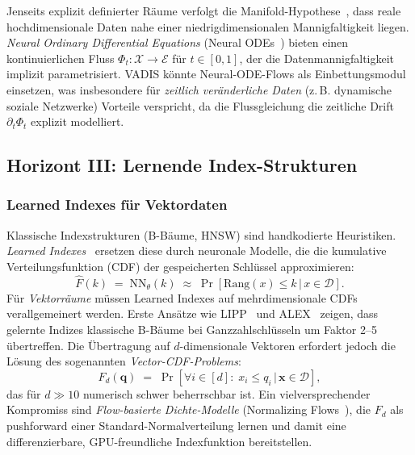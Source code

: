 ﻿\documentclass[12pt,a4paper]{article}
\begin{document}
Jenseits explizit definierter Räume verfolgt die
Manifold-Hypothese~\cite{fefferman2016testing},
dass reale hochdimensionale Daten nahe einer
niedrigdimensionalen Mannigfaltigkeit liegen.
\emph{Neural Ordinary Differential Equations}
(Neural ODEs~\cite{chen2018neuralode}) bieten einen
kontinuierlichen Fluss $\Phi_t: \mathcal{X} \to \mathcal{E}$
für $t \in [0,1]$, der die Datenmannigfaltigkeit
implizit parametrisiert. VADIS könnte Neural-ODE-Flows
als Einbettungsmodul einsetzen, was insbesondere
für \emph{zeitlich veränderliche Daten} (z.\,B.
dynamische soziale Netzwerke) Vorteile verspricht,
da die Flussgleichung die zeitliche Drift
$\partial_t \Phi_t$ explizit modelliert.

\subsection{Horizont III: Lernende Index-Strukturen}
\label{sub:horizont3}

\subsubsection{Learned Indexes für Vektordaten}

Klassische Indexstrukturen (B-Bäume, HNSW) sind
handkodierte Heuristiken. \emph{Learned Indexes}~\cite{kraska2018case}
ersetzen diese durch neuronale Modelle, die die
kumulative Verteilungsfunktion (CDF) der gespeicherten
Schlüssel approximieren:
\begin{equation}
  \hat{F}(k) \;=\; \text{NN}_\theta(k) \;\approx\;
  \Pr[\text{Rang}(x) \leq k \,|\, x \in \mathcal{D}].
\end{equation}
Für \emph{Vektorräume} müssen Learned Indexes auf
mehrdimensionale CDFs verallgemeinert werden.
Erste Ansätze wie LIPP~\cite{deng2021lipp} und
ALEX~\cite{ding2020alex} zeigen, dass gelernte Indizes
klassische B-Bäume bei Ganzzahlschlüsseln um
Faktor 2--5 übertreffen. Die Übertragung auf
$d$-dimensionale Vektoren erfordert jedoch
die Lösung des sogenannten \emph{Vector-CDF-Problems}:
\begin{equation}
  F_d(\mathbf{q}) \;=\; \Pr\!\left[
    \forall i \in [d]:\; x_i \leq q_i \,|\, \mathbf{x} \in \mathcal{D}
  \right],
\end{equation}
das für $d \gg 10$ numerisch schwer beherrschbar ist.
Ein vielversprechender Kompromiss sind \emph{Flow-basierte
Dichte-Modelle} (Normalizing Flows~\cite{rezende2015variational}),
die $F_d$ als pushforward einer Standard-Normalverteilung
lernen und damit eine differenzierbare, GPU-freundliche
Indexfunktion bereitstellen.
\end{document}
